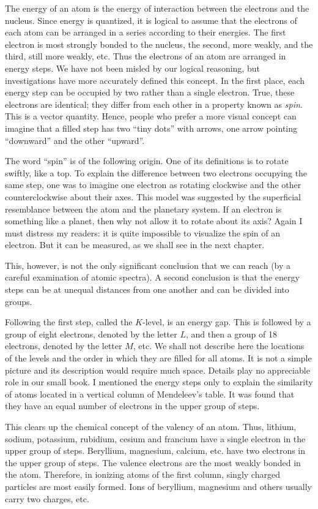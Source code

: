 The energy of an atom is the energy of interaction between the electrons and the nucleus. Since energy is quantized, it is logical to assume that the electrons of each atom can be arranged in a series according to their energies. The first electron is most strongly bonded to the nucleus, the second, more weakly, and the third, still more weakly, etc. Thus the electrons of an atom are arranged in energy steps. We have not been misled by our logical reasoning, but investigations have more accurately defined this concept. In the first place, each energy step can be occupied by two rather than a single electron. True, these electrons are identical; they differ from each other in a property known as \emph{spin}. This is a vector quantity. Hence, people who prefer a more visual concept can imagine that a filled step has two ``tiny dots'' with arrows, one arrow pointing ``downward'' and the other ``upward''.

The word ``spin'' is of the following origin. One of its definitions is to rotate swiftly, like a top. To explain the difference between two electrons occupying the same step, one was to imagine one electron as rotating clockwise and the other counterclockwise about their axes. This model was suggested by the superficial resemblance between the atom and the planetary system. If an electron is something like a planet, then why not allow it to rotate about its axis? Again I must distress my readers: it is quite impossible to visualize the spin of an electron. But it can be measured, as we shall see in the next chapter. 

This, however, is not the only significant conclusion that we can reach (by a careful examination of atomic spectra). A second conclusion is that the energy steps can be at unequal distances from one another and can be divided into groups.

Following the first step, called the $K$-level, is an energy gap. This is followed by a group of eight electrons, denoted by the letter $L$, and then a group of 18 electrons, denoted by the letter $M$, etc. We shall not describe here the locations of the levels and the order in which they are filled for all atoms. It is not a simple picture and its description would require much space. Details play no appreciable role in our small book. I mentioned the energy steps only to explain the similarity of atoms located in a vertical column of Mendeleev's table. It was found that they have an equal number of electrons in the upper group of steps.

This clears up the chemical concept of the valency of an atom. Thus, lithium, sodium, potassium, rubidium, cesium and francium have a single electron in the upper group of steps. Beryllium, magnesium, calcium, etc. have two electrons in the upper group of steps. The valence electrons are the most weakly bonded in the atom. Therefore, in ionizing atoms of the first column, singly charged particles are most easily formed. Ions of beryllium, magnesium and others usually carry two charges, etc.

